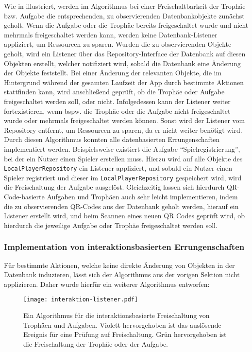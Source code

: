 \noindent Wie in  illustriert, werden im Algorithmus bei einer Freischaltbarkeit der Trophäe bzw. Aufgabe die entsprechenden, zu observierenden Datenbankobjekte zunächst geholt. Wenn die Aufgabe oder die Trophäe bereits freigeschaltet wurde und nicht mehrmals freigeschaltet werden kann, werden keine Datenbank-Listener appliziert, um Ressourcen zu sparen. Wurden die zu observierenden Objekte geholt, wird ein Listener über das Repository-Interface der Datenbank auf diesen Objekten erstellt, welcher notifiziert wird, sobald die Datenbank eine Änderung der Objekte feststellt. Bei einer Änderung der relevanten Objekte, die im Hintergrund während der gesamten Laufzeit der App durch bestimmte Aktionen stattfinden kann, wird anschließend geprüft, ob die Trophäe oder Aufgabe freigeschaltet werden soll, oder nicht. Infolgedessen kann der Listener weiter fortexistieren, wenn bspw. die Trophäe oder die Aufgabe nicht freigeschaltet wurde oder mehrmals freigeschaltet werden können. Sonst wird der Listener vom Repository entfernt, um Ressourcen zu sparen, da er nicht weiter benötigt wird. Durch diesen Algorithmus konnten alle datenbasierten Errungenschaften implementiert werden. Beispielsweise existiert die Aufgabe \enquote{Spielregistrierung}, bei der ein Nutzer einen Spieler erstellen muss. Hierzu wird auf alle Objekte des \texttt{LocalPlayerRepository} ein Listener appliziert, und sobald ein Nutzer einen Spieler registriert und dieser im \texttt{LocalPlayerRepository} gespeichert wird, wird die Freischaltung der Aufgabe ausgelöst. Gleichzeitig lassen sich hierdurch QR-Code-basierte Aufgaben und Trophäen auch sehr leicht implementieren, indem die zu observierenden QR-Codes aus der Datenbank geholt werden, hierauf ein Listener erstellt wird, und beim Scannen eines neuen QR Codes geprüft wird, ob hierdurch die jeweilige Aufgabe oder Trophäe freigeschaltet werden soll.

\subsubsection{Implementation von interaktionsbasierten Errungenschaften}

Für bestimmte Aktionen, welche keine direkte Änderung von Objekten in der Datenbank induzieren, lässt sich der Algorithmus aus der vorigen Sektion nicht applizieren. Daher wurde hierfür ein weiterer Algorithmus entworfen:

\begin{figure}[H]
\texttt{[image: interaktion-listener.pdf]}
\caption{Ein Algorithmus für die interaktionsbasierte Freischaltung von Trophäen und Aufgaben. Violett hervorgehoben ist das auslösende Ereignis für eine Prüfung auf Freischaltung. Grün hervorgehoben ist die Freischaltung der Trophäe oder der Aufgabe.}\label{fig:interaktion-listener}
\end{figure}


